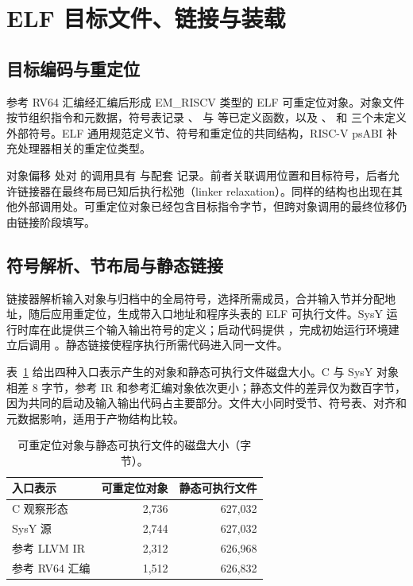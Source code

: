 \section{ELF 目标文件、链接与装载}
\label{sec:elf}

\subsection{目标编码与重定位}

参考 RV64 汇编经汇编后形成 EM\_RISCV 类型的 ELF 可重定位对象。对象文件按节组织指令和元数据，符号表记录 、 与  等已定义函数，以及 、 和  三个未定义外部符号。ELF 通用规范定义节、符号和重定位的共同结构，RISC-V psABI 补充处理器相关的重定位类型\cite{elf-gabi-2025,riscv-psabi-1.0}。

对象偏移  处对  的调用具有  与配套  记录。前者关联调用位置和目标符号，后者允许链接器在最终布局已知后执行松弛（linker relaxation）。同样的结构也出现在其他外部调用处。可重定位对象已经包含目标指令字节，但跨对象调用的最终位移仍由链接阶段填写。

\subsection{符号解析、节布局与静态链接}

链接器解析输入对象与归档中的全局符号，选择所需成员，合并输入节并分配地址，随后应用重定位，生成带入口地址和程序头表的 ELF 可执行文件\cite{lld-design-2026,elf-gabi-2025}。SysY 运行时库在此提供三个输入输出符号的定义；启动代码提供 ，完成初始运行环境建立后调用 。静态链接使程序执行所需代码进入同一文件。

表~\ref{tab:sizes} 给出四种入口表示产生的对象和静态可执行文件磁盘大小。C 与 SysY 对象相差 8 字节，参考 IR 和参考汇编对象依次更小；静态文件的差异仅为数百字节，因为共同的启动及输入输出代码占主要部分。文件大小同时受节、符号表、对齐和元数据影响，适用于产物结构比较。

\begin{table}[tb]
\caption{可重定位对象与静态可执行文件的磁盘大小（字节）。}
\label{tab:sizes}
\centering\small
\begin{tabular}{@{}lrr@{}}
\toprule
入口表示 & 可重定位对象 & 静态可执行文件\\
\midrule
C 观察形态 & 2,736 & 627,032\\
SysY 源 & 2,744 & 627,032\\
参考 LLVM IR & 2,312 & 626,968\\
参考 RV64 汇编 & 1,512 & 626,832\\
\bottomrule
\end{tabular}
\end{table}

